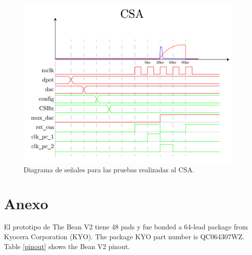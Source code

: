 \documentclass[11pt,letterpaper,spanish]{article}
\begin{document}
\begin{figure}[!t]
	\centering
	\includegraphics[width=1\textwidth]{./figuras/tiempos_csa.png}
	\caption{Diagrama de señales para las pruebas realizadas al CSA.}\label{fig:diagramacsa}
\end{figure}



\clearpage
\section{Anexo}
El prototipo de The Bean V2 tiene 48 pads y fue bonded a 64-lead package from \mbox{Kyocera} Corporation (KYO). The package KYO part number is QC064307WZ. Table \ref{pinout} shows the Bean V2 pinout.
\end{document}
